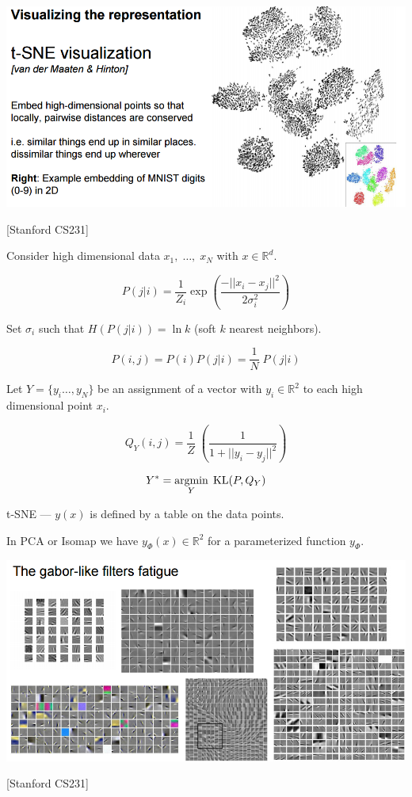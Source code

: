 {\centerline{\includegraphics[width = 9.5in]{../images/t-SNE}}
\centerline{[Stanford CS231]}

Consider high dimensional data $x_1,\;\ldots,\;x_N$ with $x \in \mathbb{R}^d$.

\vfill
$$P(j|i) = \frac{1}{Z_i} \exp\left(\frac{-||x_i -x_j||^2}{2\sigma_i^2}\right)$$

\vfill
Set $\sigma_i$ such that $H(P(j|i)) = \ln k$ (soft $k$ nearest neighbors).

\vfill
$$P(i,j) = P(i)P(j|i) = \frac{1}{N}\;P(j|i)$$

Let $Y = \{y_i\ldots,y_N\}$ be an assignment of a vector with $y_i \in \mathbb{R}^2$ to each high dimensional point $x_i$.

\vfill
$$Q_Y(i,j) = \frac{1}{Z}\;\left(\frac{1}{1 + ||y_i -y_j||^2}\right)$$

\vfill
$$Y^* = \operatorname*{argmin}_Y \;\mathrm{KL}(P,Q_Y)$$


t-SNE --- $y(x)$ is defined by a table on the data points.

\vfill
In PCA or Isomap we have $y_\Phi(x) \in \mathbb{R}^2$ for a parameterized function $y_\Phi$.


\centerline{\includegraphics[width = 9.5in]{../images/Filters}}
\centerline{[Stanford CS231]}

}

